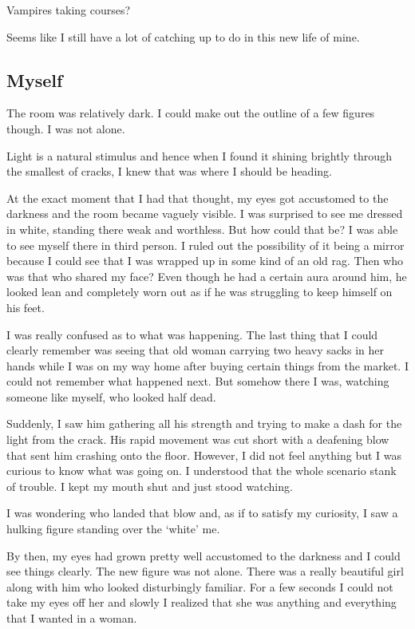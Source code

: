 \documentclass[twoside,11pt,titlepage]{article}
\begin{document}
Vampires taking courses?

Seems like I still have a lot of catching up to do in this new life of mine.

\newpage
\begin{center}
  \section{Myself}
\end{center}
\bigskip
\bigskip
\bigskip

The room was relatively dark. I could make out the outline of a few figures though. I was not alone.

Light is a natural stimulus and hence when I found it shining brightly through the smallest of cracks, I knew that was where I should be heading.

At the exact moment that I had that thought, my eyes got accustomed to the darkness and the room became vaguely visible. I was surprised to see me dressed in white, standing there weak and worthless. But how could that be? I was able to see myself there in third person. I ruled out the possibility of it being a mirror because I could see that I was wrapped up in some kind of an old rag. Then who was that who shared my face? Even though he had a certain aura around him, he looked lean and completely worn out as if he was struggling to keep himself on his feet.

I was really confused as to what was happening. The last thing that I could clearly remember was seeing that old woman carrying two heavy sacks in her hands while I was on my way home after buying certain things from the market. I could not remember what happened next. But somehow there I was, watching someone like myself, who looked half dead.

Suddenly, I saw him gathering all his strength and trying to make a dash for the light from the crack. His rapid movement was cut short with a deafening blow that sent him crashing onto the floor. However, I did not feel anything but I was curious to know what was going on. I understood that the whole scenario stank of trouble. I kept my mouth shut and just stood watching.

I was wondering who landed that blow and, as if to satisfy my curiosity, I saw a hulking figure standing over the `white' me.

By then, my eyes had grown pretty well accustomed to the darkness and I could see things clearly. The new figure was not alone. There was a really beautiful girl along with him who looked disturbingly familiar. For a few seconds I could not take my eyes off her and slowly I realized that she was anything and everything that I wanted in a woman.
\end{document}
